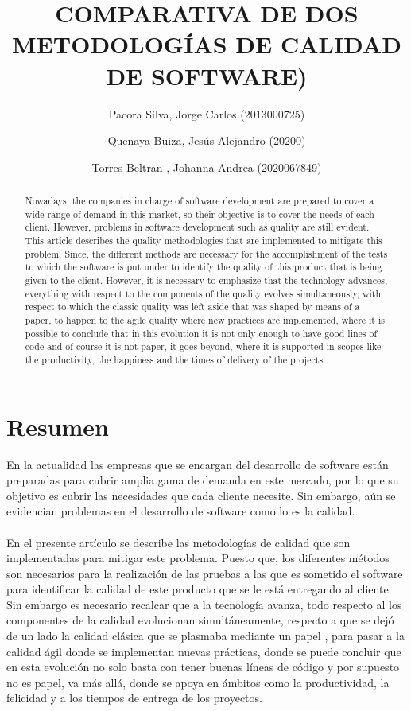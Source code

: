 \documentclass[preprint,12pt]{elsarticle}
\begin{document}
	
	\begin{frontmatter}

		\title{\huge  COMPARATIVA DE DOS METODOLOGÍAS DE CALIDAD DE SOFTWARE) }
		\author{Pacora Silva, Jorge Carlos				(2013000725)}
		\author{Quenaya Buiza, Jesús Alejandro			(20200)}
		\author{Torres Beltran , Johanna Andrea			(2020067849)}
		\address{Tacna, Perú}
		


\begin{abstract}
Nowadays, the companies in charge of software development are prepared to cover a wide range of demand in this market, so their objective is to cover the needs of each client. However, problems in software development such as quality are still evident.
\\
This article describes the quality methodologies that are implemented to mitigate this problem. Since, the different methods are necessary for the accomplishment of the tests to which the software is put under to identify the quality of this product that is being given to the client.
However, it is necessary to emphasize that the technology advances, everything with respect to the components of the quality evolves simultaneously, with respect to which the classic quality was left aside that was shaped by means of a paper, to happen to the agile quality where new practices are implemented, where it is possible to conclude that in this evolution it is not only enough to have good lines of code and of course it is not paper, it goes beyond, where it is supported in scopes like the productivity, the happiness and the times of delivery of the projects.
\end{abstract}


\end{frontmatter}

\section{Resumen}
En la actualidad las empresas que se encargan del desarrollo de software están preparadas para cubrir amplia gama de demanda en este mercado, por lo que su  objetivo es cubrir las necesidades que cada cliente necesite. Sin embargo, aún se evidencian problemas en el desarrollo de software como lo es la calidad.
\\
\\
En el  presente artículo se describe las metodologías de calidad que son implementadas para mitigar este problema. Puesto que, los diferentes métodos  son necesarios para la realización de las  pruebas a las que es sometido el software para identificar la calidad de este producto que se le está entregando al cliente.
Sin embargo es necesario recalcar que a la tecnología avanza, todo respecto al los componentes de la calidad  evolucionan simultáneamente, respecto a que se dejó de un lado la calidad clásica que se plasmaba mediante un papel , para pasar a la calidad ágil donde se implementan nuevas prácticas, donde se puede concluir que en esta evolución no solo basta con tener buenas líneas de código y por supuesto no es papel, va más allá, donde se apoya en ámbitos como la productividad, la felicidad y a los tiempos de entrega de los proyectos.
\end{document}
